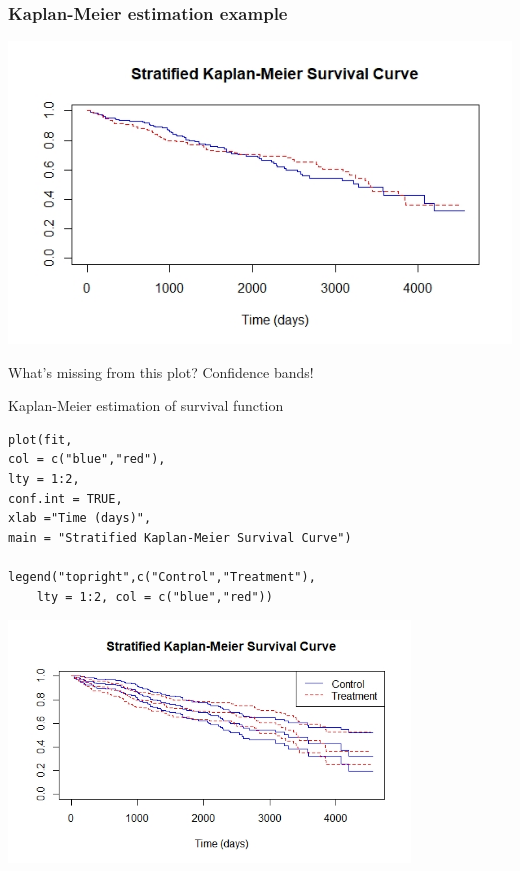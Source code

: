 \documentclass[10pt,t]{beamer}
\begin{document}
\begin{frame}
\frametitle{Kaplan-Meier estimation example}
	\begin{center}
		\includegraphics[width=\textwidth]{figs/r_km_strat}
	\end{center}
	What's missing from this plot?   Confidence bands!
\end{frame}

\begin{frame}[fragile]{Kaplan-Meier estimation of survival function}
\vspace{-5 mm}

\footnotesize
\begin{verbatim}
plot(fit, 
col = c("blue","red"),
lty = 1:2,
conf.int = TRUE,
xlab ="Time (days)",
main = "Stratified Kaplan-Meier Survival Curve")

legend("topright",c("Control","Treatment"),
    lty = 1:2, col = c("blue","red"))
\end{verbatim}


	\begin{center}
		\includegraphics[width=0.8\textwidth]{figs/r_km_strat_ci}
	\end{center}

\end{frame}
\end{document}
